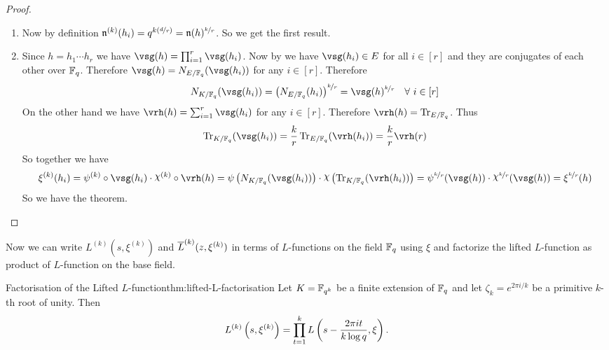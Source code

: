 \begin{proof}
  \begin{enumerate}[label=(\roman*)]
    \item Now by definition $\mathfrak{n}^{(k)}(h_i)=q^{k\left(\nicefrac{d}{r}\right)}=\mathfrak{n}(h)^{\nicefrac{k}{r}}$. So we get the first result. 
    \item Since $h=h_1\cdots h_r$ we have $\vsg(h)=\prod_{i=1}^r\vsg(h_i)$. Now by  we have $\vsg(h_i)\in E$ for all $i\in[r]$ and they are conjugates of each other over $\mathbb{F}_q$. Therefore $\vsg(h)=N_{E/\bbF_q}(\vsg(h_i))$ for any $i\in[r]$. Therefore $$N_{K/\bbF_q}(\vsg(h_i))=\lt(N_{E/\bbF_q}(h_i)\rt)^{\nicefrac{k}{r}}=\vsg(h)^{\nicefrac{k}{r}}\quad \forall\ i\in[r]$$On the other hand we have $\vrh(h)=\sum_{i=1}^r\vsg(h_i)$ for any $i\in[r]$. Therefore $\vrh(h)=\tr_{E/\bbF_q}$. Thus $$\tr_{K/\bbF_q}(\vsg(h_i)) =\frac{k}{r}\tr_{E/\bbF_q}(\vrh(h_i))=\frac{k}{r}\vrh(r)$$So together we have $$\xi^{(k)}(h_i)= \psi^{(k)}\circ\vsg(h_i)\cdot \chi^{(k)}\circ\vrh(h)=\psi\lt(N_{K/\bbF_q}(\vsg(h_i))\rt)\cdot \chi\lt(\tr_{K/\bbF_q}(\vrh(h_i))\rt)=\psi^{\nicefrac{k}r}(\vsg(h))\cdot \chi^{\nicefrac{k}r}(\vsg(h))=\xi^{\nicefrac{k}{r}}(h)$$So we have the theorem. 
  \end{enumerate}
\end{proof}
Now we can write $L^{(k)}(s,\xi^{(k)})$ and $\overline{L}^{(k)}(z,\xi^{(k)})$ in terms of $L$-functions on the field $\mathbb{F}_q$ using $\xi$ and factorize the lifted $L$-function as product of $L$-function on the base field. 
\begin{Theorem}{Factorisation of the Lifted $L$-function}{thm:lifted-L-factorisation}
  Let $K=\mathbb{F}_{q^k}$ be a finite extension of $\mathbb{F}_q$ and let $\zeta_k=e^{2\pi i/k}$ be a primitive $k$-th root of unity. Then
  $$L^{(k)}\left(s,\xi^{(k)}\right)=\prod_{t=1}^{k}L\left(s-\frac{2\pi it}{k\log q},\xi\right).$$
\end{Theorem}
